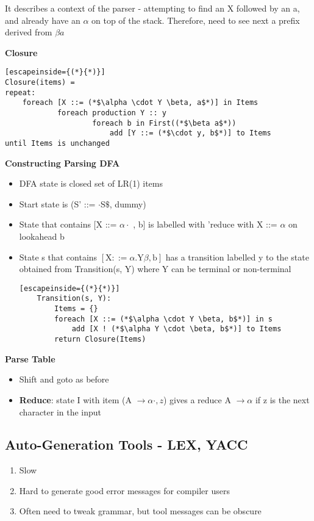 \documentclass{article}
\newenvironment{cons}{\par\color{red}}{\par}
\begin{document}
It describes a context of the parser - attempting to find an X followed by an a, and already have an $\alpha$ on top of the stack. Therefore, need to see next a prefix derived from $\beta a$

\bigskip
\noindent
\textbf{Closure}
\begin{lstlisting}[escapeinside={(*}{*)}]
Closure(items) = 
repeat:
	foreach [X ::= (*$\alpha \cdot Y \beta, a$*)] in Items
			foreach production Y :: y
					foreach b in First((*$\beta a$*))
						add [Y ::= (*$\cdot y, b$*)] to Items
until Items is unchanged	
\end{lstlisting}

\bigskip
\noindent
\textbf{Constructing Parsing DFA}
\begin{itemize}
	\item DFA state is closed set of LR(1) items
	\item Start state is (S' ::= $\cdot$S$\$ $, dummy)
	\item State that contains [X ::= $\alpha \cdot$ , b] is labelled with 'reduce with X ::= $\alpha$ on lookahead b
	\item State s that contains $[\mathrm{X} : :=\alpha . \mathrm{Y} \beta, \mathrm{b}]$ has a transition labelled y to the state obtained from Transition(s, Y) where Y can be terminal or non-terminal
	\begin{lstlisting}[escapeinside={(*}{*)}]
	Transition(s, Y):
		Items = {}
		foreach [X ::= (*$\alpha \cdot Y \beta, b$*)] in s
			add [X ! (*$\alpha Y \cdot \beta, b$*)] to Items
		return Closure(Items)
	\end{lstlisting}
\end{itemize}

\bigskip
\noindent
\textbf{Parse Table}
\begin{itemize}
	\item Shift and goto as before
	\item \textbf{Reduce}: state I with item (A $\rightarrow \alpha \cdot, z$) gives a reduce A $\rightarrow \alpha$ if z is the next character in the input 
\end{itemize}

\subsection{Auto-Generation Tools - LEX, YACC}
\begin{cons}
	\begin{enumerate}
		\item Slow
		\item Hard to generate good error messages for compiler users
		\item Often need to tweak grammar, but tool messages can be obscure
	\end{enumerate}
\end{cons}
\end{document}
